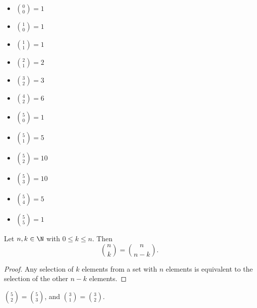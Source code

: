 \documentclass[12pt]{article}
\begin{document}
\begin{exmp}\proofbreak
    \begin{multicols}{3}
        \begin{itemize}
            \item $\binom{0}{0} = 1$
            \item $\binom{1}{0} = 1$
            \item $\binom{1}{1} = 1$
            \item $\binom{2}{1} = 2$
        \end{itemize}

        \columnbreak

        \begin{itemize}
            \item $\binom{3}{2} = 3$
            \item $\binom{4}{2} = 6$
            \item $\binom{5}{0} = 1$
            \item $\binom{5}{1} = 5$
        \end{itemize}

        \columnbreak

        \begin{itemize}
            \item $\binom{5}{2} = 10$
            \item $\binom{5}{3} = 10$
            \item $\binom{5}{4} = 5$
            \item $\binom{5}{5} = 1$
        \end{itemize}
    \end{multicols}
\end{exmp}

\begin{prop}\label{binomial-complement}
    Let $n, k \in \N$ with $0 \leq k \leq n$. Then \[\binom{n}{k} = \binom{n}{n-k}.\]
\end{prop}

\begin{proof}
    Any selection of $k$ elements from a set with $n$ elements is equivalent to the selection of the other $n-k$ elements.
\end{proof}

\begin{exmp}
    $\binom{5}{2} = \binom{5}{3}$, and $\binom{3}{1} = \binom{3}{2}$.
\end{exmp}
\end{document}
